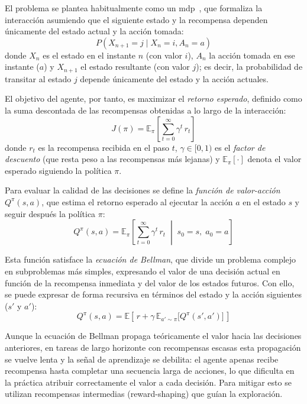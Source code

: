 El problema se plantea habitualmente como un \gls{mdp}~\cite{DBLP:books/wi/Puterman94}, que formaliza la interacción 
asumiendo que el siguiente estado y la recompensa dependen únicamente del estado actual y la acción tomada:
\begin{equation}
    P(X_{n+1} = j \mid X_n = i, A_n = a)
\end{equation}
donde $X_n$ es el estado en el instante $n$ (con valor $i$), $A_n$ la acción tomada en ese
instante ($a$) y $X_{n+1}$ el estado resultante (con valor $j$); es decir, la probabilidad
de transitar al estado $j$ depende únicamente del estado y la acción actuales.
    
El objetivo del agente, por tanto, es maximizar el \textit{retorno esperado}, definido como la suma
descontada de las recompensas obtenidas a lo largo de la interacción:
\begin{equation}
    J(\pi) = \mathbb{E}_{\pi}\!\left[\sum_{t=0}^{\infty} \gamma^{t}\, r_t\right]
\end{equation}
donde $r_t$ es la recompensa recibida en el paso $t$, $\gamma \in [0,1)$ es el
\textit{factor de descuento} (que resta peso a las recompensas más lejanas) y
$\mathbb{E}_{\pi}[\cdot]$ denota el valor esperado siguiendo la \gls{política} $\pi$.

Para evaluar la calidad de las decisiones se define la \textit{función de valor-acción}
$Q^{\pi}(s,a)$, que estima el retorno esperado al ejecutar la acción $a$ en el estado $s$
y seguir después la \gls{política} $\pi$:
\begin{equation}
    Q^{\pi}(s,a) = \mathbb{E}_{\pi}\!\left[\sum_{t=0}^{\infty} \gamma^{t}\, r_t
    \;\middle|\; s_0 = s,\; a_0 = a\right]
\end{equation}

Esta función satisface la \textit{ecuación de Bellman}, que divide un problema complejo en subproblemas más simples, expresando el valor de una decisión actual en función de la recompensa inmediata y del valor de los estados futuros. Con ello, se puede expresar de forma recursiva
en términos del estado y la acción siguientes ($s'$ y $a'$):
\begin{equation}
    Q^{\pi}(s,a) = \mathbb{E}\!\left[\, r + \gamma\, \mathbb{E}_{a'\sim\pi}\big[Q^{\pi}(s',a')\big]\,\right]
\end{equation}

Aunque la ecuación de Bellman propaga teóricamente el valor hacia las decisiones anteriores,
en tareas de largo horizonte con recompensas escasas esta propagación se vuelve lenta y la señal
de aprendizaje se debilita: el agente apenas recibe recompensa hasta completar una secuencia larga
de acciones, lo que dificulta en la práctica atribuir correctamente el valor a cada decisión.
Para mitigar esto se utilizan recompensas intermedias (\gls{reward-shaping}) que guían la exploración.

